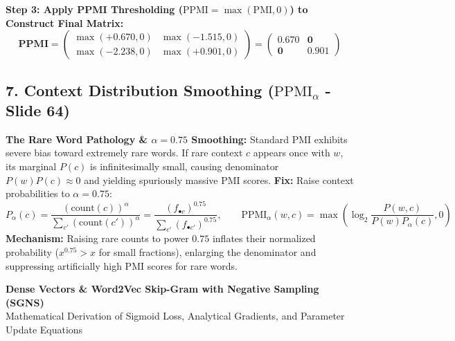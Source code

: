 \documentclass[10pt,a4paper]{article}
\begin{document}
\begin{examplebox}
\vspace{1pt}
\textbf{Step 3: Apply PPMI Thresholding ($\text{PPMI} = \max(\text{PMI}, 0)$) to Construct Final Matrix:}
\begin{equation*}
    \mathbf{PPMI} = 
    \begin{pmatrix}
    \max(+0.670, 0) & \max(-1.515, 0) \\
    \max(-2.238, 0) & \max(+0.901, 0)
    \end{pmatrix}
    =
    \begin{pmatrix}
    \mathbf{0.670} & \mathbf{0} \\
    \mathbf{0}     & \mathbf{0.901}
    \end{pmatrix}
\end{equation*}
\end{examplebox}

\vspace{-2pt}
\subsection*{\color{themeblue} 7. Context Distribution Smoothing ($\text{PPMI}_\alpha$ - Slide 64)}
\vspace{-2pt}

\begin{insightbox}
\footnotesize
\textbf{The Rare Word Pathology \& $\alpha = 0.75$ Smoothing:} Standard PMI exhibits severe bias toward extremely rare words. If rare context $c$ appears once with $w$, its marginal $P(c)$ is infinitesimally small, causing denominator $P(w)P(c) \approx 0$ and yielding spuriously massive PMI scores. \textbf{Fix:} Raise context probabilities to $\alpha = 0.75$:
\begin{equation}
    P_\alpha(c) = \frac{(\text{count}(c))^{\alpha}}{\sum_{c'} (\text{count}(c'))^{\alpha}} = \frac{(f_{\bullet c})^{0.75}}{\sum_{c'} (f_{\bullet c'})^{0.75}}, \qquad \text{PPMI}_\alpha(w, c) = \max\left( \log_2 \frac{P(w, c)}{P(w) P_\alpha(c)}, 0 \right)
\end{equation}
\textbf{Mechanism:} Raising rare counts to power $0.75$ inflates their normalized probability ($x^{0.75} > x$ for small fractions), enlarging the denominator and suppressing artificially high PMI scores for rare words.
\end{insightbox}

\clearpage

\begin{center}
    \vspace{-4pt}
    {\Large\bfseries\color{themeblue} Dense Vectors \& Word2Vec Skip-Gram with Negative Sampling (SGNS)}\\[1pt]
    {\small\color{darkgray} Mathematical Derivation of Sigmoid Loss, Analytical Gradients, and Parameter Update Equations}
    \vspace{-4pt}
\end{center}
\end{document}
